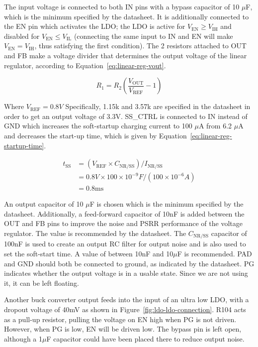 \documentclass{default}
\begin{document}
The input voltage is connected to both IN pins with a bypass capacitor of 10 $\mu$F, which is the
minimum specified by the datasheet. It is additionally connected to the EN pin which activates the
LDO; the LDO is active for $V_{\text{EN}} \geq V_{\text{IH}}$ and disabled for
$V_{\text{EN}} \leq V_{\text{IL}}$ (connecting the same input to IN and EN will make
$V_{\text{EN}} = V_{\text{IH}}$, thus satisfying the first condition). The 2 resistors attached to
OUT and FB make a voltage divider that determines the output voltage of the linear regulator,
according to Equation~\ref{eq:linear-reg-vout}.

\begin{equation}
  R_1 = R_2\left(\frac{V_{\text{OUT}}}{V_{\text{REF}}}-1\right) \label{eq:linear-reg-vout}
\end{equation}

Where $V_{\text{REF}} = 0.8V$ Specifically, 1.15k and 3.57k are specified in the datasheet in order
to get an output voltage of 3.3V. SS\_CTRL is connected to IN instead of GND which increases the
soft-startup charging current to 100 $\mu$A from 6.2 $\mu$A and decreases the start-up time, which
is given by Equation~\ref{eq:linear-reg-startup-time}.

\begin{align}
  t_{\text{SS}} &= (V_{\text{REF}} \times C_{\text{NR/SS}}) /
                  I_{\text{NR/SS}} \label{eq:linear-reg-startup-time} \\
                &= 0.8V \times 100 \times 10^{-9} F/(100 \times 10^{-6} A) \\
                &= 0.8\text{ms}
\end{align}

An output capacitor of 10 $\mu$F is chosen which is the minimum specified by the
datasheet. Additionally, a feed-forward capacitor of 10nF is added between the OUT and FB pins to
improve the noise and PSRR performance of the voltage regulator. The value is recommended by the
datasheet. The $C_{\text{NR/SS}}$ capacitor of 100nF is used to create an output RC filter for
output noise and is also used to set the soft-start time. A value of between 10nF and 10$\mu$F is
recommended. PAD and GND should both be connected to ground, as indicated by the datasheet. PG
indicates whether the output voltage is in a usable state. Since we are not using it, it can be left
floating.

Another buck converter output feeds into the input of an ultra low LDO, with a dropout voltage of
40mV as shown in Figure~\ref{fig:ldo-ldo-connection}. R104 acts as a pull-up resistor, pulling the
voltage on EN high when PG is not driven. However, when PG is low, EN will be driven low. The bypass
pin is left open, although a 1$\mu$F capacitor could have been placed there to reduce output noise.
\end{document}
